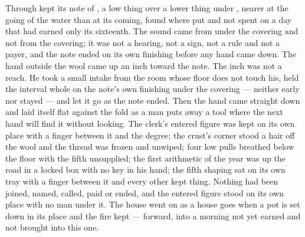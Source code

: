 Through   kept its note of , a low thing over a lower thing under , nearer at the going of the water than at its coming, found where put and not spent on a day that had earned only its sixteenth. The sound came from under the covering and not from the covering; it was not a hearing, not a sign, not a rule and not a payer, and the note ended on its own finishing before any hand came down. The hand outside the wool came up an inch toward the note. The inch was not a reach. He took a small intake from the room whose floor does not touch his, held the interval whole on the note's own finishing under the covering --- neither early nor stayed --- and let it go as the note ended. Then the hand came straight down and laid itself flat against the fold as a man puts away a tool where the next hand will find it without looking. The clerk's entered figure was kept on its own place with a finger between it and the degree; the crust's corner stood a hair off the wool and the thread was frozen and unwiped; four low pulls breathed below the floor with the fifth unsupplied; the first arithmetic of the year was up the road in a locked box with no key in his hand; the fifth shaping sat on its own tray with a finger between it and every other kept thing. Nothing had been joined, named, called, paid or ended, and the entered figure stood on its own place with no man under it. The house went on as a house goes when a pot is set down in its place and the fire kept --- forward, into a morning not yet earned and not brought into this one.
